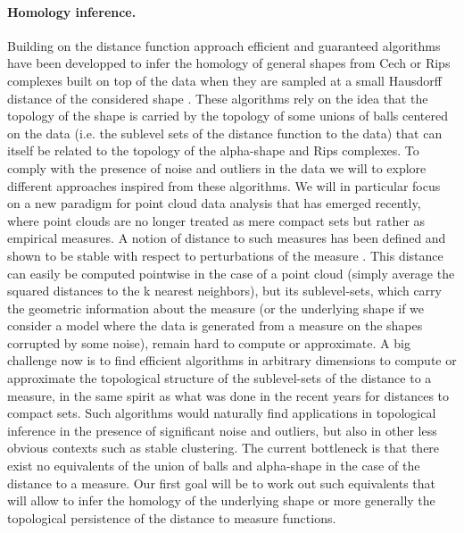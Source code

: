 

\paragraph{Homology inference.}
Building on the distance function approach efficient and guaranteed algorithms have been developped to infer the homology of general shapes from Cech or Rips complexes built on top of the data   when they are sampled at a small Hausdorff distance of the considered shape \cite{co-tpr-2008}. These algorithms rely on  the idea that the topology of the shape is carried  by the topology of some  unions of balls centered on the data (i.e. the sublevel sets of the distance function to the data)  that can itself be related to the topology of the  alpha-shape and Rips complexes.
To comply with the presence of noise and outliers in the data we will to explore different approaches inspired from these algorithms. 
We will in particular focus on a new paradigm for point cloud data analysis that has emerged recently, where point clouds are no
longer treated as mere compact sets but rather as empirical measures. A notion of distance to
such measures has been defined and shown to be stable with respect to perturbations of the
measure \cite{ccsm-gipm-2011}. This distance can easily be computed pointwise in the case of a point cloud (simply
average the squared distances to the k nearest neighbors), but its sublevel-sets, which carry the
geometric information about the measure (or the underlying shape if we consider a model where the data is generated from a measure on the shapes corrupted by some noise), remain hard to compute or approximate. A big challenge now is to find efficient algorithms in arbitrary dimensions to compute or approximate
the topological structure of the sublevel-sets of the distance to a measure, in the same spirit as
what was done in the recent years for distances to compact sets. Such algorithms would naturally
find applications in topological inference in the presence of significant noise and outliers, but
also in other less obvious contexts such as stable clustering. The current bottleneck is that 
there exist no equivalents of the union of balls and alpha-shape in the case of the distance to
a measure. Our first goal will be to work out such equivalents that will allow to infer the homology of the underlying shape or more generally the topological persistence of the distance to measure functions.




